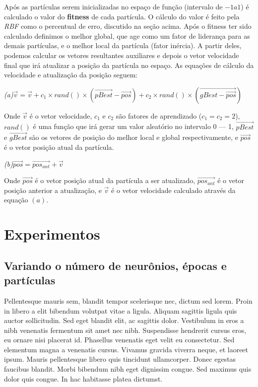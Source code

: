 \documentclass[10pt,twocolumn,letterpaper]{article}
\begin{document}
Após as partículas serem inicializadas no espaço de função (intervalo de $-1 a 1$) é calculado o valor do \textbf{fitness} de cada partícula. O cálculo do valor é feito pela \textit{RBF} como o percentual de erro, discutido na seção acima.
Após o fitness ter sido calculado definimos o melhor global, que age como um fator de liderança para as demais partículas, e o melhor local da partícula (fator inércia). A partir deles, podemos calcular os vetores resultantes auxiliares e depois o vetor velocidade final que irá atualizar a posição da partícula no espaço. As equações de cálculo da velocidade e atualização da posição seguem:

\begin{center}
\textit{(a)}\qquad$\vec{v} = \vec{v} + c_1 \times rand() \times (\vec{pBest} - \vec{pos}) + c_2 \times rand() \times (\vec{gBest - \vec{pos}})$ 
\end{center}

Onde $\vec{v}$ é o vetor velocidade, $c_1$ e $c_2$ são fatores de aprendizado ($c_1 = c_2 = 2$), $rand()$ é uma função que irá gerar um valor aleatório no intervalo 0 --- 1, $\vec{pBest}$ e $\vec{gBest}$ são os vetores de posição do melhor local e global respectivamente, e $\vec{pos}$ é o vetor posição atual da partícula. 

\begin{center}
\textit{(b)}\qquad$\vec{pos} = \vec{pos_{ant}} + \vec{v}$ 
\end{center}
Onde $\vec{pos}$ é o vetor posição atual da partícula a ser atualizado, $\vec{pos_{ant}}$ é o vetor posição anterior a atualização, e $\vec{v}$ é o vetor velocidade calculado através da equação $(a)$.

\section{Experimentos}

\subsection{Variando o número de neurônios, épocas e partículas}
Pellentesque mauris sem, blandit tempor scelerisque nec, dictum sed lorem. Proin in libero a elit bibendum volutpat vitae a ligula. Aliquam sagittis ligula quis auctor sollicitudin. Sed eget blandit elit, ac sagittis dolor. Vestibulum in eros a nibh venenatis fermentum sit amet nec nibh. Suspendisse hendrerit cursus eros, eu ornare nisi placerat id. Phasellus venenatis eget velit eu consectetur. Sed elementum magna a venenatis cursus. Vivamus gravida viverra neque, et laoreet ipsum. Mauris pellentesque libero quis tincidunt ullamcorper. Donec egestas faucibus blandit. Morbi bibendum nibh eget dignissim congue. Sed maximus quis dolor quis congue. In hac habitasse platea dictumst.
\end{document}

